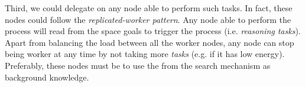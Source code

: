 Third, we could delegate on any node able to perform such tasks.
In fact, these nodes could follow the \emph{replicated-worker pattern}.
Any node able to perform the process will read from the space goals to trigger the process (i.e. \emph{reasoning tasks}).
Apart from balancing the load between all the worker nodes, any node can stop being worker at any time by not taking more \emph{tasks} (e.g. if it has low energy).
Preferably, these nodes must be \Consumers{} to use the \clues{} from the search mechanism as background knowledge.






